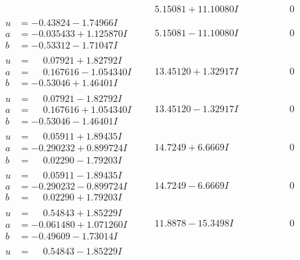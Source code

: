 \documentclass[1p]{elsarticle_modified}
\theoremstyle{definition}
\begin{document}
$$\begin{array}{c|c|c}
 & \phantom{-}5.15081 + 11.10080 I & \phantom{-0.000000 } 0 \\ \hline\begin{aligned}
u &= -0.43824 - 1.74966 I \\
a &= -0.035433 + 1.125870 I \\
b &= -0.53312 - 1.71047 I\end{aligned}
 & \phantom{-}5.15081 - 11.10080 I & \phantom{-0.000000 } 0 \\ \hline\begin{aligned}
u &= \phantom{-}0.07921 + 1.82792 I \\
a &= \phantom{-}0.167616 - 1.054340 I \\
b &= -0.53046 + 1.46401 I\end{aligned}
 & \phantom{-}13.45120 + 1.32917 I & \phantom{-0.000000 } 0 \\ \hline\begin{aligned}
u &= \phantom{-}0.07921 - 1.82792 I \\
a &= \phantom{-}0.167616 + 1.054340 I \\
b &= -0.53046 - 1.46401 I\end{aligned}
 & \phantom{-}13.45120 - 1.32917 I & \phantom{-0.000000 } 0 \\ \hline\begin{aligned}
u &= \phantom{-}0.05911 + 1.89435 I \\
a &= -0.290232 + 0.899724 I \\
b &= \phantom{-}0.02290 - 1.79203 I\end{aligned}
 & \phantom{-}14.7249 + 6.6669 I & \phantom{-0.000000 } 0 \\ \hline\begin{aligned}
u &= \phantom{-}0.05911 - 1.89435 I \\
a &= -0.290232 - 0.899724 I \\
b &= \phantom{-}0.02290 + 1.79203 I\end{aligned}
 & \phantom{-}14.7249 - 6.6669 I & \phantom{-0.000000 } 0 \\ \hline\begin{aligned}
u &= \phantom{-}0.54843 + 1.85229 I \\
a &= -0.061480 + 1.071260 I \\
b &= -0.49609 - 1.73014 I\end{aligned}
 & \phantom{-}11.8878 - 15.3498 I & \phantom{-0.000000 } 0 \\ \hline\begin{aligned}
u &= \phantom{-}0.54843 - 1.85229 I \\

\end{aligned}
\end{array}$$
\end{document}
